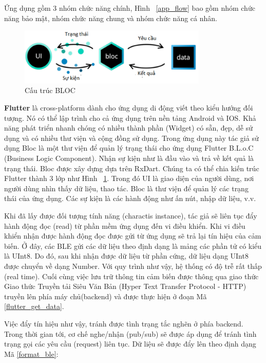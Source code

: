 Ứng dụng gồm 3 nhóm chức năng chính, Hình ~\ref{app_flow} bao gồm nhóm chức năng bảo mật, nhóm chức năng chung và nhóm chức năng cá nhân.
\begin{figure}[!]
		\centering
 		\includegraphics[width=0.8\textwidth]{images/flutter.png}
		\caption{Cấu trúc BLOC}
		\label{flutter}
\end{figure}




\textbf{Flutter} là cross-platform dành cho ứng dụng di động viết theo kiểu hướng đối tượng. Nó có thể lập trình cho cả ứng dụng trên nền tảng Android và IOS. Khả năng phát triển nhanh chóng có nhiều thành phần (Widget) có sẵn, đẹp, dễ sử dụng và có nhiều thư viện và cộng đồng sử dụng. Trong ứng dụng này tác giả sử dụng Bloc là một thư viện để quản lý trạng thái cho ứng dụng Flutter B.L.o.C (Business Logic Component). Nhận sự kiện như là đầu vào và trả về kết quả là trạng thái. Bloc được xây dựng dựa trên RxDart. Chúng ta có thể chia kiến trúc Flutter thành 3 lớp như Hình ~\ref{flutter}. Trong đó UI là giao diện của người dùng, nơi người dùng nhìn thấy dữ liệu, thao tác. Bloc là thư viện để quản lý các trạng thái của ứng dụng. Các sự kiện là các hành động như ấn nút, nhập dữ liệu, v.v.




Khi đã lấy được đối tượng tính năng (charactis instance), tác giả sẽ liên tục đẩy  hành động đọc (read) từ phần mềm ứng dụng đến vi điều khiển. Khi vi điều khiển nhận được hành động đọc được gửi từ ứng dụng sẽ trả lại tín hiệu của cảm biến. Ở đây, các BLE gửi các dữ liệu theo định dạng là mảng các phần tử có kiểu là UInt8. Do đó, sau khi nhận được dữ liệu từ phần cứng, dữ liệu dạng UInt8 được chuyển về dạng Number. Với quy trình như vậy, hệ thống có độ trễ rất thấp (real time). Cuối cùng việc lưu trữ thông tin cảm biến được thông qua giao thức Giao thức Truyền tải Siêu Văn Bản (Hyper Text Transfer Protocol - HTTP) truyền lên phía máy chủ(backend) và được thực hiện ở đoạn Mã \ref{flutter_get_data}.

Việc đẩy tín hiệu như vậy, tránh được tình trạng tắc nghẽn ở phía backend. Trong thời gian tới, cơ chế nghe/nhận (pub/sub) sẽ được áp dụng để tránh tình trạng gọi các yêu cầu (request) liên tục. Dữ liệu sẽ được đẩy lên theo định dạng Mã \ref{format_ble}:


